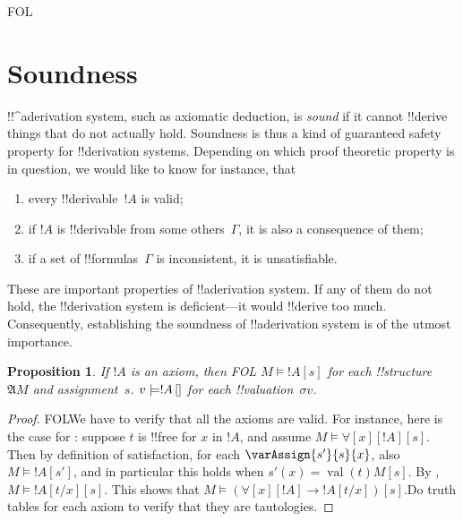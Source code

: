 \documentclass[10pt,a4paper]{article}
\makeatletter
\theoremstyle{plain}
\newtheorem{prop}[thm]{Proposition}
\theoremstyle{definition}
\theoremstyle{remark}
\newenvironment{explain}{}{}
\newcommand*{\olfileid}[3]{}
\newcommand*{\olsection}[1]{\section*{#1}}
\newcommand{\olref}{\@ifnextchar[{\olref@i}{\olref@final}}
\def\olref@i[#1]{\@ifnextchar[{\olref@ii}{\olref@final}}
\def\olref@ii[#1]{\@ifnextchar[{\olref@iii}{\olref@final}}
\def\olref@iii[#1]{\olref@final}
\def\olref@final#1{\ref{#1}}
\providecommand{\lif}{\mathbin{\rightarrow}}
\providecommand{\lforall}{\mathord{\forall}}
\providecommand{\Subst}[3]{#1[#2/#3]}
\providecommand{\Struct}{\ensuremath{\mathfrak{A}}}
\providecommand{\Sat}[2]{\ensuremath{#1 \models #2}}
\providecommand{\iftag}[1]{#1}
\providecommand{\Value}[1]{\operatorname{val}(#1)}
\providecommand{\pSat}[3]{#1 \models #2\,[#3]}
\providecommand{\pAssign}{\sigma}
\makeatother
\begin{document}



\iftag{FOL}
      {\olfileid{fol}{axd}{sou}}
      {\olfileid{pl}{axd}{sou}}
      
\olsection{Soundness}

\begin{explain}
!!^a{derivation} system, such as axiomatic deduction, is \emph{sound}
if it cannot !!{derive} things that do not actually hold.  Soundness is
thus a kind of guaranteed safety property for !!{derivation} systems.
Depending on which proof theoretic property is in question, we would
like to know for instance, that
\begin{enumerate}
\item every !!{derivable}~$!A$ is valid;
\item if $!A$ is !!{derivable} from some others~$\Gamma$, it is also a
  consequence of them;
\item if a set of !!{formula}s~$\Gamma$ is inconsistent, it is
  unsatisfiable.
\end{enumerate}
These are important properties of !!a{derivation} system.  If any of them do
not hold, the !!{derivation} system is deficient---it would !!{derive} too much.
Consequently, establishing the soundness of !!a{derivation} system is of the
utmost importance.
\end{explain}

\begin{prop}
  If $!A$ is an axiom, then
  \iftag{FOL}
    {$\Sat{M}{!A}[s]$ for each !!{structure}~$\Struct{M}$ and assignment~$s$.}
    {$\pSat{v}{!A}$ for each !!{valuation}~$\pAssign{v}$.}
\end{prop}

\begin{proof}
\iftag{FOL}{We have to verify that all the axioms are valid. For
  instance, here is the case for \olref[qua]{ax:q1}: suppose $t$ is
  !!{free for} $x$ in $!A$, and assume
  $\Sat{M}{\lforall[x][!A]}[s]$. Then by definition of satisfaction,
  for each $\varAssign{s'}{s}{x}$, also $\Sat{M}{!A}[s']$, and in particular
  this holds when $s'(x) = \Value{t}{M}[s]$. By
  \olref[syn][ext]{prop:ext-formulas},
  $\Sat{M}{\Subst{!A}{t}{x}}[s]$. This shows that
  $\Sat{M}{(\lforall[x][!A] \lif \Subst{!A}{t}{x})}[s]$.}{Do truth
  tables for each axiom to verify that they are tautologies.}
\end{proof}
\end{document}

